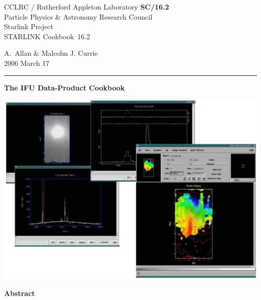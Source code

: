 \documentclass[twoside,11pt]{article}
\newcommand{\stardoccategory}  {STARLINK Cookbook}
\newcommand{\stardocinitials}  {SC}
\newcommand{\stardocnumber}    {16.2}
\newcommand{\stardocauthors}   {A.~Allan \& Malcolm J. Currie}
\newcommand{\stardocdate}      {2006 March 17}
\newcommand{\stardoctitle}     {The IFU Data-Product Cookbook}
\newcommand{\stardocname}{\stardocinitials /\stardocnumber}
\newenvironment{latexonly}{}{}
\begin{document}
\thispagestyle{empty}

\begin{latexonly}
   CCLRC / {\sc Rutherford Appleton Laboratory} \hfill {\bf \stardocname}\\
   {\large Particle Physics \& Astronomy Research Council}\\
   {\large Starlink Project\\}
   {\large \stardoccategory\ \stardocnumber}
   \begin{flushright}
   \stardocauthors\\
   \stardocdate
   \end{flushright}
   \vspace{-4mm}
   \rule{\textwidth}{0.5mm}
   \vspace{5mm}
   \begin{center}
   {\Huge\bf  \stardoctitle \\ [2.5ex]}
   \end{center}
   \vspace{5mm}

   \begin{center}
   \includegraphics[scale=0.6]{sc16_cover.eps}
   \end{center}

   \vspace{5mm}
   \begin{center}
      {\Large\bf Abstract}
   \end{center}
\end{latexonly}
\end{document}
